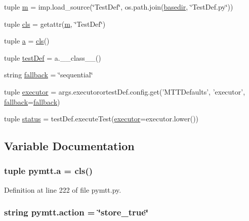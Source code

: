 \begin{DoxyCompactItemize}
\item 
tuple \hyperlink{namespacepymtt_ab13a60c31fa69917ce06c1a2631aaf02}{m} = imp.\-load\-\_\-source(\char`\"{}Test\-Def\char`\"{}, os.\-path.\-join(\hyperlink{namespacepymtt_a57729393cfbd99464570d7fa5ad9fa05}{basedir}, \char`\"{}Test\-Def.\-py\char`\"{}))
\item 
tuple \hyperlink{namespacepymtt_a17f658b5d141d51664bb3ede8830c4c0}{cls} = getattr(\hyperlink{namespacepymtt_ab13a60c31fa69917ce06c1a2631aaf02}{m}, \char`\"{}Test\-Def\char`\"{})
\item 
tuple \hyperlink{namespacepymtt_a55825c16c4bd231f7ffbd0fe52407e3f}{a} = \hyperlink{namespacepymtt_a17f658b5d141d51664bb3ede8830c4c0}{cls}()
\item 
tuple \hyperlink{namespacepymtt_afebe539e6104da8ebd3d06b7a0e77fe7}{test\-Def} = a.\-\_\-\-\_\-class\-\_\-\-\_\-()
\item 
string \hyperlink{namespacepymtt_a5d5ee597f85e5c40ec6a923a4398c291}{fallback} = \char`\"{}sequential\char`\"{}
\item 
tuple \hyperlink{namespacepymtt_a283715e769294f7b1362c85498cdf2a3}{executor} = args.\-executorortest\-Def.\-config.\-get('M\-T\-T\-Defaults', 'executor', \hyperlink{namespacepymtt_a5d5ee597f85e5c40ec6a923a4398c291}{fallback}=\hyperlink{namespacepymtt_a5d5ee597f85e5c40ec6a923a4398c291}{fallback})
\item 
tuple \hyperlink{namespacepymtt_a1a2fd13626c1c2d248cedc138e8660ec}{status} = test\-Def.\-execute\-Test(\hyperlink{namespacepymtt_a283715e769294f7b1362c85498cdf2a3}{executor}=executor.\-lower())
\end{DoxyCompactItemize}


\subsection{Variable Documentation}
\hypertarget{namespacepymtt_a55825c16c4bd231f7ffbd0fe52407e3f}{
\subsubsection[{a}]{\setlength{\rightskip}{0pt plus 5cm}tuple pymtt.\-a = {\bf cls}()}}\label{namespacepymtt_a55825c16c4bd231f7ffbd0fe52407e3f}


Definition at line 222 of file pymtt.\-py.

\hypertarget{namespacepymtt_a5ee564a034624d925bb8dc823d11c522}{
\subsubsection[{action}]{\setlength{\rightskip}{0pt plus 5cm}string pymtt.\-action = \char`\"{}store\-\_\-true\char`\"{}}}\label{namespacepymtt_a5ee564a034624d925bb8dc823d11c522}


